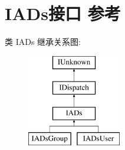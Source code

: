 \hypertarget{interface_i_a_ds}{}\section{I\+A\+Ds接口 参考}
\label{interface_i_a_ds}
类 I\+A\+Ds 继承关系图\+:\begin{figure}[H]
\begin{center}
\leavevmode
\includegraphics[height=4.000000cm]{interface_i_a_ds}
\end{center}
\end{figure}
